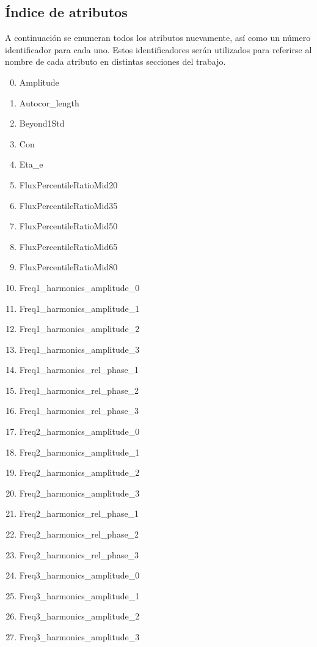 \begin{appendix}
\section{Índice de atributos}
\label{indice_atributos}
A continuación se enumeran todos los atributos nuevamente, así como un número identificador para cada uno. Estos identificadores serán utilizados para referirse al nombre de cada atributo en distintas secciones del trabajo. 

\begin{multicols}{2}
\begin{enumerate}[noitemsep]
\setcounter{enumi}{-1}
\item Amplitude
\item Autocor\_length
\item Beyond1Std
\item Con
\item Eta\_e
\item FluxPercentileRatioMid20
\item FluxPercentileRatioMid35
\item FluxPercentileRatioMid50
\item FluxPercentileRatioMid65
\item FluxPercentileRatioMid80
\item Freq1\_harmonics\_amplitude\_0
\item Freq1\_harmonics\_amplitude\_1
\item Freq1\_harmonics\_amplitude\_2
\item Freq1\_harmonics\_amplitude\_3
\item Freq1\_harmonics\_rel\_phase\_1
\item Freq1\_harmonics\_rel\_phase\_2
\item Freq1\_harmonics\_rel\_phase\_3
\item Freq2\_harmonics\_amplitude\_0
\item Freq2\_harmonics\_amplitude\_1
\item Freq2\_harmonics\_amplitude\_2
\item Freq2\_harmonics\_amplitude\_3
\item Freq2\_harmonics\_rel\_phase\_1
\item Freq2\_harmonics\_rel\_phase\_2
\item Freq2\_harmonics\_rel\_phase\_3
\item Freq3\_harmonics\_amplitude\_0
\item Freq3\_harmonics\_amplitude\_1
\item Freq3\_harmonics\_amplitude\_2
\item Freq3\_harmonics\_amplitude\_3

\end{enumerate}
\end{multicols}
\end{appendix}
